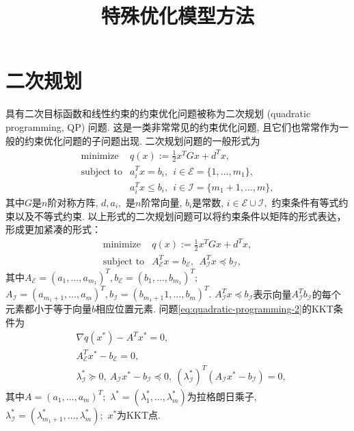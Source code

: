 \documentclass{SBCbookchapter}
\author{}
\title{特殊优化模型方法}
\begin{document}
\maketitle


\section{二次规划}
\label{sec:7.2}

具有二次目标函数和线性约束的约束优化问题被称为二次规划 (quadratic programming, QP) 问题. 这是一类非常常见的约束优化问题, 且它们也常常作为一般的约束优化问题的子问题出现. 二次规划问题的一般形式为
\begin{equation}
\label{eq:quadratic-programming-1}
\begin{array}{cl}
\text{minimize} & q(x) := \frac{1}{2} x^T G x + d^T x, \\
\text{subject to} & a_i^T x = b_i, ~~ i \in \mathcal{E} = \{1, \ldots, m_1\}, \\
& a_i^T x \leqslant b_i, ~~ i \in \mathcal{I} = \{m_1 + 1, \ldots, m\},
\end{array}
\end{equation}
其中$G$是$n$阶对称方阵, $d, a_i,$ 是$n$阶常向量, $b_i$是常数, $i \in \mathcal{E} \cup \mathcal{I},$ 约束条件有等式约束以及不等式约束. 以上形式的二次规划问题可以将约束条件以矩阵的形式表达，形成更加紧凑的形式：
\begin{equation}
\label{eq:quadratic-programming-2}
\begin{array}{cl}
\text{minimize} & q(x) := \frac{1}{2} x^T G x + d^T x, \\
\text{subject to} & A^T_{\mathcal{E}} x = b_{\mathcal{E}}, ~~ A^T_{\mathcal{I}} x \preccurlyeq b_{\mathcal{I}},
\end{array}
\end{equation}
其中$A_{\mathcal{E}} = (a_1, \ldots, a_{m_1})^T, b_{\mathcal{E}} = (b_1, \ldots, b_{m_1})^T;$ $A_{\mathcal{I}} = (a_{m_1+1}, \ldots, a_m)^T, b_{\mathcal{I}} = (b_{m_1+1}1, \ldots, b_m)^T.$ $A^T_{\mathcal{I}} x \preccurlyeq b_{\mathcal{I}}$表示向量$A^T_{\mathcal{I}} b_{\mathcal{I}}$的每个元素都小于等于向量$b$相应位置元素. 问题\eqref{eq:quadratic-programming-2}的KKT条件为
\begin{equation}
\label{eq:quadratic-programming-kkt}
\begin{aligned}
& \nabla q(x^*) - A^T x^* = 0, \\
& A^T_{\mathcal{E}} x^* - b_{\mathcal{E}} = 0, \\
& \lambda^*_{\mathcal{I}} \succcurlyeq 0, ~ A_{\mathcal{I}} x^* - b_{\mathcal{I}} \preccurlyeq 0, ~ (\lambda^*_{\mathcal{I}})^T (A_{\mathcal{I}} x^* - b_{\mathcal{I}}) = 0,
\end{aligned}
\end{equation}
其中$A = (a_1, \ldots, a_m)^T;$ $\lambda^* = (\lambda_1^*, \ldots, \lambda_m^*)$为拉格朗日乘子, $\lambda^*_{\mathcal{I}} = (\lambda_{m_1+1}^*, \ldots, \lambda_m^*);$ $x^*$为KKT点.
\end{document}
